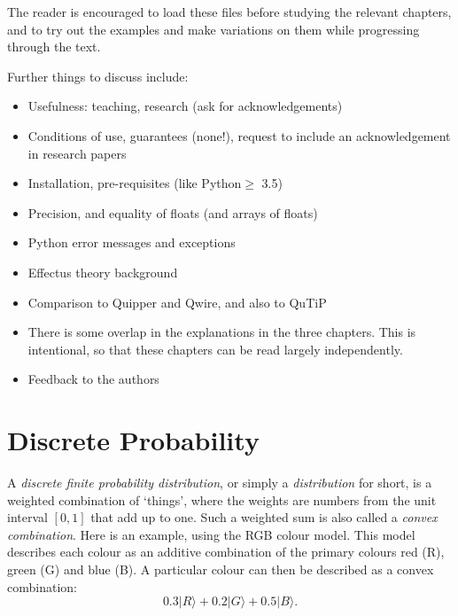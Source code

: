 \documentclass[leqno]{tufte-book} %
\newcommand{\Python}{\textrm{Python}\xspace}
\newcommand{\ket}[1]{\ensuremath{|#1\rangle}}
\begin{document}
\noindent The reader is encouraged to load these files before studying
the relevant chapters, and to try out the examples and make variations
on them while progressing through the text.


\bigskip

Further things to discuss include:
\begin{itemize}
\item Usefulness: teaching, research (ask for acknowledgements)

\item Conditions of use, guarantees (none!), request to include an
  acknowledgement in research papers

\item Installation, pre-requisites (like \Python $\geq$ 3.5)

\item Precision, and equality of floats (and arrays of floats)

\item \Python error messages and exceptions

\item Effectus theory background

\item Comparison to Quipper and Qwire, and also to QuTiP

\item There is some overlap in the explanations in the three
  chapters. This is intentional, so that these chapters can be read
  largely independently.

\item Feedback to the authors

\end{itemize}



\mainmatter


\chapter{Discrete Probability}\label{ch:dp}

A \emph{discrete finite probability distribution},
or simply a \emph{distribution} for short, is a weighted combination
of `things', where the weights are numbers from the unit interval
$[0,1]$ that add up to one. Such a weighted sum is also called a
\emph{convex combination}. Here is an
example, using the RGB colour model.  This model describes each colour
as an additive combination of the primary colours red (R), green (G)
and blue (B). A particular colour can then be described as a convex
combination:
$$0.3\ket{R} + 0.2\ket{G} + 0.5\ket{B}.$$
\end{document}
